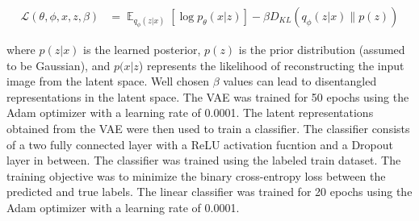 \documentclass{article}
\DeclareMathOperator{\E}{\mathbb{E}}
\begin{document}
\begin{align}
  \mathcal{L}(\theta, \phi, x, z, \beta) & = \E_{q_\phi(z|x)}[\log p_\theta(x|z)] - \beta D_{KL}(q_\phi(z|x)\| p(z))
\end{align}

where $p(z|x)$ is the learned posterior, $p(z)$ is the prior distribution
(assumed to be Gaussian), and $p(x|z$) represents the likelihood of
reconstructing the input image from the latent space. Well chosen $\beta$
values can lead to disentangled representations in the latent space. The VAE
was trained for 50 epochs using the Adam optimizer with a learning rate of
0.0001. The latent representations obtained from the VAE were then used to
train a classifier. The classifier consists of a two fully connected layer with
a ReLU activation fucntion and a Dropout layer in between. The classifier was
trained using the labeled train dataset. The training objective was to minimize
the binary cross-entropy loss between the predicted and true labels. The linear
classifier was trained for 20 epochs using the Adam optimizer with a learning
rate of 0.0001.
\end{document}

